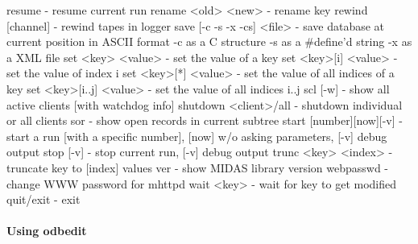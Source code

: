 \begin{DoxyCode}
resume                  - resume current run
rename <old> <new>      - rename key
rewind [channel]        - rewind tapes in logger
save [-c -s -x -cs] <file>  - save database at current position
                          in ASCII format
  -c                      as a C structure
  -s                      as a #define'd string
  -x                      as a XML file
set <key> <value>       - set the value of a key
set <key>[i] <value>    - set the value of index i
set <key>[*] <value>    - set the value of all indices of a key
set <key>[i..j] <value> - set the value of all indices i..j
scl [-w]                - show all active clients [with watchdog info]
shutdown <client>/all   - shutdown individual or all clients
sor                     - show open records in current subtree
start [number][now][-v] - start a run [with a specific number],
                          [now] w/o asking parameters, [-v] debug output
stop [-v]               - stop current run, [-v] debug output
trunc <key> <index>     - truncate key to [index] values
ver                     - show MIDAS library version
webpasswd               - change WWW password for mhttpd
wait <key>              - wait for key to get modified
quit/exit               - exit
\end{DoxyCode}


\par
 

\label{index_end}
\hypertarget{index_end}{}
 \paragraph{Using odbedit}\label{RC_odbedit_examples}
\label{RC_odbedit_examples_idx_odbedit-utility_examples}
\hypertarget{RC_odbedit_examples_idx_odbedit-utility_examples}{}
 \par
 


